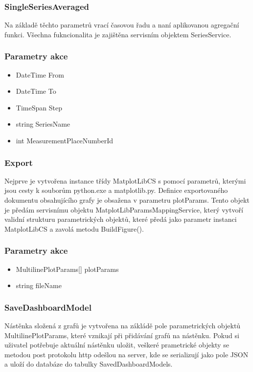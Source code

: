 \documentclass[FM,BP]{tulthesis}
\begin{document}
        \subsubsection*{SingleSeriesAveraged}
            Na základě těchto parametrů vrací časovou řadu a naní aplikovanou agregační funkci. Všechna fukncionalita je zajištěna servisním objektem SeriesService.
            \subsubsection*{Parametry akce}
                \begin{itemize}
                    \item DateTime From
                    \item DateTime To
                    \item TimeSpan Step
                    \item string SeriesName
                    \item int MeasurementPlaceNumberId
                \end{itemize}
                
        \subsubsection*{Export}
            Nejprve je vytvořena instance třídy MatplotLibCS s pomocí parametrů, kterými jsou cesty k souborům python.exe a matplotlib.py.
            Definice exportovaného dokumentu obsahujícího grafy je obsažena v parametru plotParams. Tento objekt je předám servisnímu objektu MatplotLibParamsMappingService, 
            který vytvoří validní strukturu parametrických objektů, které předá jako parametr instanci MatplotLibCS a zavolá metodu BuildFigure().
            \subsubsection*{Parametry akce}
                \begin{itemize}
                    \item MultilinePlotParams[] plotParams
                    \item string fileName 
                \end{itemize}

        \subsubsection*{SaveDashboardModel}
            Nástěnka složená z grafů je vytvořena na zákládě pole parametrických objektů MultilinePlotParams, které vznikají při přidávání grafů na nástěnku.
            Pokud si uživatel potřebuje aktuální nástěnku uložit, veškeré prametrické objekty se metodou post protokolu http odešlou na server, kde se serializují jako pole JSON
            a uloží do databáze do tabulky SavedDashboardModels.
\end{document}
